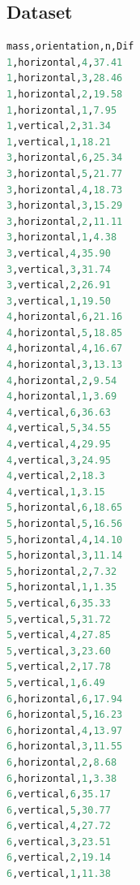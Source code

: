 \documentclass[a4paper,11pt]{article}
\begin{document}
\subsection{Dataset}
\begin{lstlisting}[language=Python]
mass,orientation,n,Dif
1,horizontal,4,37.41
1,horizontal,3,28.46
1,horizontal,2,19.58
1,horizontal,1,7.95
1,vertical,2,31.34
1,vertical,1,18.21
3,horizontal,6,25.34
3,horizontal,5,21.77
3,horizontal,4,18.73
3,horizontal,3,15.29
3,horizontal,2,11.11
3,horizontal,1,4.38
3,vertical,4,35.90
3,vertical,3,31.74
3,vertical,2,26.91
3,vertical,1,19.50
4,horizontal,6,21.16
4,horizontal,5,18.85
4,horizontal,4,16.67
4,horizontal,3,13.13
4,horizontal,2,9.54
4,horizontal,1,3.69
4,vertical,6,36.63
4,vertical,5,34.55
4,vertical,4,29.95
4,vertical,3,24.95
4,vertical,2,18.3
4,vertical,1,3.15
5,horizontal,6,18.65
5,horizontal,5,16.56
5,horizontal,4,14.10
5,horizontal,3,11.14
5,horizontal,2,7.32
5,horizontal,1,1.35
5,vertical,6,35.33
5,vertical,5,31.72
5,vertical,4,27.85
5,vertical,3,23.60
5,vertical,2,17.78
5,vertical,1,6.49
6,horizontal,6,17.94
6,horizontal,5,16.23
6,horizontal,4,13.97
6,horizontal,3,11.55
6,horizontal,2,8.68
6,horizontal,1,3.38
6,vertical,6,35.17
6,vertical,5,30.77
6,vertical,4,27.72
6,vertical,3,23.51
6,vertical,2,19.14
6,vertical,1,11.38
\end{lstlisting}
\label{Code: 1}

\newpage
\end{document}
